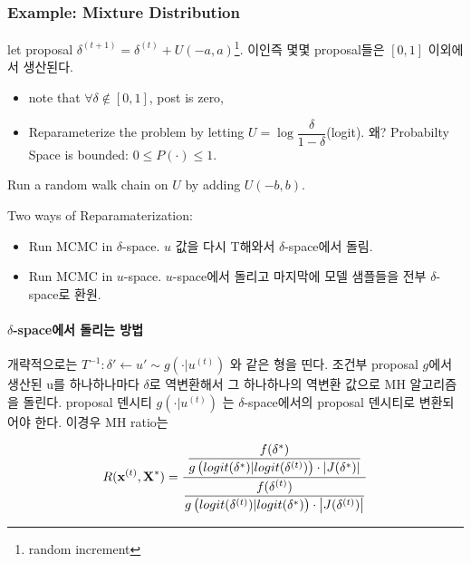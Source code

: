 \documentclass[
]{book}
\providecommand{\tightlist}{%
  \setlength{\itemsep}{0pt}\setlength{\parskip}{0pt}}
\begin{document}
\hypertarget{example-mixture-distribution}{%
\subsubsection{Example: Mixture Distribution}\label{example-mixture-distribution}}

let proposal \(\delta^{(t+1)} = \delta^{(t)} + U(-a, a)\)\footnote{random increment}. 이인즉 몇몇 proposal들은 \([0, 1]\) 이외에서 생산된다.

\begin{itemize}
\tightlist
\item
  note that \(\forall \delta \notin [0,1]\), post is zero,
\item
  Reparameterize the problem by letting \(U = \log{\dfrac {\delta}{1-\delta}}\)(logit). 왜? Probabilty Space is bounded: \(0 \le P(\cdot) \le 1\).
\end{itemize}

Run a random walk chain on \(U\) by adding \(U(-b,b)\).

Two ways of Reparamaterization:

\begin{itemize}
\tightlist
\item
  Run MCMC in \(\delta\)-space. \(u\) 값을 다시 T해와서 \(\delta\)-space에서 돌림.
\item
  Run MCMC in \(u\)-space. \(u\)-space에서 돌리고 마지막에 모델 샘플들을 전부 \(\delta\)-space로 환원.
\end{itemize}

\hypertarget{delta-spaceuxc5d0uxc11c-uxb3ccuxb9acuxb294-uxbc29uxbc95}{%
\paragraph{\texorpdfstring{\(\delta\)-space에서 돌리는 방법}{\textbackslash delta-space에서 돌리는 방법}}\label{delta-spaceuxc5d0uxc11c-uxb3ccuxb9acuxb294-uxbc29uxbc95}}

개략적으로는 \(T^{-1}: \delta' \leftarrow u' \sim g( \cdot \rvert u^{(t)})\) 와 같은 형을 띤다. 조건부 proposal \(g\)에서 생산된 u를 하나하나마다 \(\delta\)로 역변환해서 그 하나하나의 역변환 값으로 MH 알고리즘을 돌린다. proposal 덴시티 \(g( \cdot \rvert u^{(t)} )\) 는 \(\delta\)-space에서의 proposal 덴시티로 변환되어야 한다. 이경우 MH ratio는

\[
R (\textbf {x}^{(t)}, \textbf X^{\ast} )
=\dfrac
{\dfrac
{f(\delta^{\ast})}
{g \left( logit(\delta^{\ast}) \rvert logit(\delta^{(t)}) \right) \cdot \left| J(\delta^{\ast})\right|}
}
{\dfrac
{f(\delta^{(t)})}
{g \left( logit(\delta^{(t)})|logit(\delta^{\ast}) \right) \cdot \left| J(\delta^{(t)})\right|}
}
\]
\end{document}

